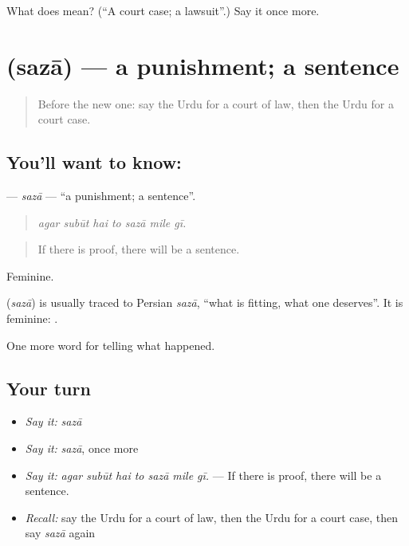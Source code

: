 \begin{tcolorbox}[breakable,colback=teal!4,colframe=teal!35!black,title={Before you move on}]
What does  mean? (\textquotedblleft{}A court case; a lawsuit\textquotedblright{}.) Say it once more.
\end{tcolorbox}
\section[\texorpdfstring{\ur{سزا} (sazā)}{سزا (sazā)}]{ (sazā) — a punishment; a sentence}

\label{lesson:UR-C283-saza}



\begin{quote}
Before the new one: say the Urdu for a court of law, then the Urdu for a court case.
\end{quote}

\subsection*{You'll want to know: }
\textbf{} — \emph{sazā} — \textquotedblleft{}a punishment; a sentence\textquotedblright{}.

\begin{quote}
      
\end{quote}

\begin{quote}
\emph{agar subūt hai to sazā mile gī.}
\end{quote}

\begin{quote}
If there is proof, there will be a sentence.
\end{quote}

Feminine.

\begin{cousinweb}
\textbf{} (\emph{sazā}) is usually traced to Persian \emph{sazā}, \textquotedblleft{}what is fitting, what one deserves\textquotedblright{}. It is feminine: \textbf{  }.
\end{cousinweb}

\begin{grammarlens}[title={What you've built}]
One more word for telling what happened.
\end{grammarlens}

\subsection*{Your turn}
\begin{itemize}
\raggedright
  \item \emph{Say it:} \emph{sazā}
  \item \emph{Say it:} \emph{sazā}, once more
  \item \emph{Say it:} \emph{agar subūt hai to sazā mile gī.} — If there is proof, there will be a sentence.
  \item \emph{Recall:} say the Urdu for a court of law, then the Urdu for a court case, then say \emph{sazā} again
\end{itemize}

